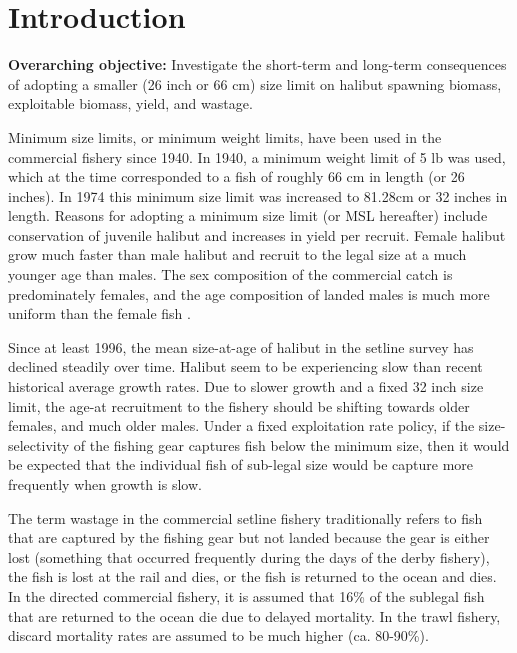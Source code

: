 \section{Introduction} %
\label{sec:introduction}

\textbf{Overarching objective:} Investigate the short-term and long-term consequences of adopting a smaller (26 inch or 66 cm) size limit on halibut spawning biomass, exploitable biomass, yield, and wastage.

Minimum size limits, or minimum weight limits, have been used in the commercial fishery since 1940.  In 1940, a minimum weight limit of 5 lb was used, which at the time corresponded to a fish of roughly 66 cm in length (or 26 inches).  In 1974 this minimum size limit was increased to 81.28cm or 32 inches in length.  Reasons for adopting a minimum size limit (or MSL hereafter) include conservation of juvenile halibut and increases in yield per recruit. Female halibut grow much faster than male halibut and recruit to the legal size at a much younger age than males.  The sex composition of the commercial catch is predominately females, and the age composition of landed males is much more uniform than the female fish \citep{Hare2012Rara}.  

Since at least 1996, the mean size-at-age of halibut in the setline survey has declined steadily over time.  Halibut seem to be experiencing slow than recent historical average growth rates.  Due to slower growth and a fixed 32 inch size limit, the age-at recruitment to the fishery should be shifting towards older females, and much older males.  Under a fixed exploitation rate policy, if the size-selectivity of the fishing gear captures fish below the minimum size, then it would be expected that the individual fish of sub-legal size would be capture more frequently when growth is slow.

The term wastage in the commercial setline fishery traditionally refers to fish that are captured by the fishing gear but not landed because the gear is either lost (something that occurred frequently during the days of the derby fishery), the fish is lost at the rail and dies, or the fish is returned to the ocean and dies.  In the directed commercial fishery, it is assumed that 16\% of the sublegal fish that are returned to the ocean die due to delayed mortality.  In the trawl fishery, discard mortality rates are assumed to be much higher (ca. 80-90\%).  

